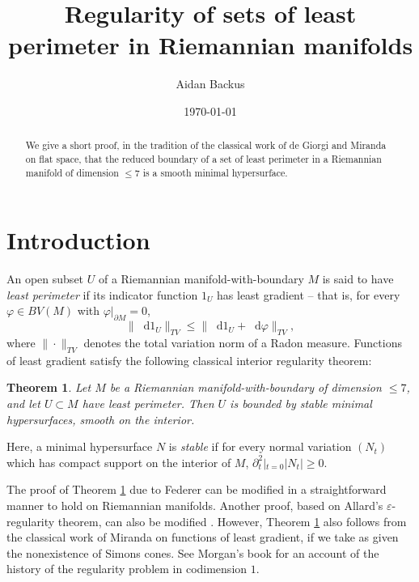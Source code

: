 \documentclass[reqno,11pt]{amsart}
\title{Regularity of sets of least perimeter in Riemannian manifolds}
\author{Aidan Backus}
\date{\today}
\newcommand*\dif{\mathop{}\!\mathrm{d}}
\newcommand{\dfn}[1]{\emph{#1}\index{#1}}
\newtheorem{theorem}{Theorem}[section]
\theoremstyle{definition}
\numberwithin{equation}{section}
\begin{document}
\begin{abstract}
    We give a short proof, in the tradition of the classical work of de Giorgi and Miranda on flat space, that the reduced boundary of a set of least perimeter in a Riemannian manifold of dimension $\leq 7$ is a smooth minimal hypersurface.
\end{abstract}

\maketitle

\section{Introduction}
An open subset $U$ of a Riemannian manifold-with-boundary $M$ is said to have \dfn{least perimeter} if its indicator function $1_U$ has least gradient -- that is, for every $\varphi \in BV(M)$ with $\varphi|_{\partial M} = 0$, 
\begin{equation}\label{least perimeter dfn}
\|\dif 1_U\|_{TV} \leq \|\dif 1_U + \dif \varphi\|_{TV},
\end{equation}
where $\|\cdot\|_{TV}$ denotes the total variation norm of a Radon measure.
Functions of least gradient satisfy the following classical interior regularity theorem:

\begin{theorem}\label{main thm}
Let $M$ be a Riemannian manifold-with-boundary of dimension $\leq 7$, and let $U \subset M$ have least perimeter.
Then $U$ is bounded by stable minimal hypersurfaces, smooth on the interior.
\end{theorem}

Here, a minimal hypersurface $N$ is \dfn{stable} if for every normal variation $(N_t)$ which has compact support on the interior of $M$, $\partial_t^2|_{t = 0} |N_t| \geq 0$.

The proof of Theorem \ref{main thm} due to Federer \cite{Federer70} can be modified in a straightforward manner to hold on Riemannian manifolds.
Another proof, based on Allard's $\varepsilon$-regularity theorem, can also be modified \cite{DeLellis18}.
However, Theorem \ref{main thm} also follows from the classical work of Miranda \cite{Miranda66} on functions of least gradient, if we take as given the nonexistence of Simons cones.
See Morgan's book \cite[Chapter 8]{morgan2016geometric} for an account of the history of the regularity problem in codimension $1$.
\end{document}
